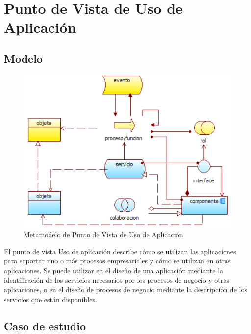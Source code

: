 \newpage

\section{Punto de Vista de Uso de Aplicación}

\subsection{Modelo}

\begin{figure}[th!]
	\centering
	\includegraphics[width=0.5\linewidth]{arquitectura/imagenes/modeloUsoAplicacion}
	\caption{Metamodelo de Punto de Vista de Uso de Aplicación \cite{pun10}}
	\label{fig:metamodelo de punto de vista de uso de aplicación}
\end{figure}
El punto de vista Uso de aplicación describe cómo se utilizan las aplicaciones para soportar uno o más procesos empresariales y cómo se utilizan en otras aplicaciones. Se puede utilizar en el diseño de una aplicación mediante la identificación de los servicios necesarios por los procesos de negocio y otras aplicaciones, o en el diseño de procesos de negocio mediante la descripción de los servicios que están disponibles.

\subsection{Caso de estudio}

\newpage


